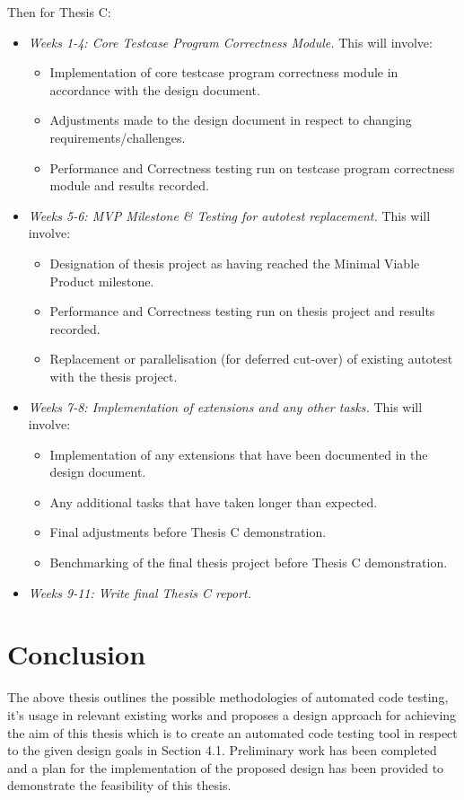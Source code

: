 \documentclass[hidelinks]{report}
\newcommand{\unchapter}[2]{
    \setcounter{chapter}{#1}
    \setcounter{section}{0}
    \chapter*{#2}
    \addcontentsline{toc}{chapter}{#2}
}
\begin{document}
Then for Thesis C:
\begin{itemize}
	\item \textit{Weeks 1-4: Core Testcase Program Correctness Module.} This will involve:
	\begin{itemize}
		\item Implementation of core testcase program correctness module in accordance with the design document.
		\item Adjustments made to the design document in respect to changing requirements/challenges.
		\item Performance and Correctness testing run on testcase program correctness module and results recorded.
	\end{itemize}
	\item \textit{Weeks 5-6: MVP Milestone \& Testing for autotest replacement.} This will involve:
	\begin{itemize}
		\item Designation of thesis project as having reached the Minimal Viable Product milestone.
		\item Performance and Correctness testing run on thesis project and results recorded.
		\item Replacement or parallelisation (for deferred cut-over) of existing autotest with the thesis project.
	\end{itemize}
	\item \textit{Weeks 7-8: Implementation of extensions and any other tasks.} This will involve:
	\begin{itemize}
		\item Implementation of any extensions that have been documented in the design document.
		\item Any additional tasks that have taken longer than expected.
		\item Final adjustments before Thesis C demonstration.
		\item Benchmarking of the final thesis project before Thesis C demonstration.
	\end{itemize}
	\item \textit{Weeks 9-11: Write final Thesis C report.}
\end{itemize}

\unchapter{6}{Conclusion}

The above thesis outlines the possible methodologies of automated code testing, it's usage in relevant existing works and proposes a design approach for achieving the aim of this thesis which is to create an automated code testing tool in respect to the given design goals in Section 4.1.
Preliminary work has been completed and a plan for the implementation of the proposed design has been provided to demonstrate the feasibility of this thesis.
\end{document}
